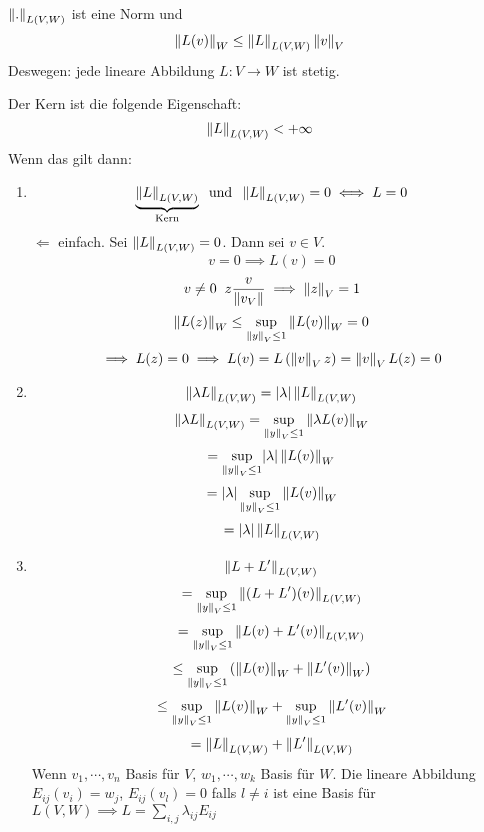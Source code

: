 \begin{Sat}
  $\left\| . \right\|_{L(V,W)}$ ist eine Norm und
  \[\left\| L(v) \right\|_W\leq \left\| L \right\|_{L(V,W)}\left\| v \right\|_V\]
  Deswegen: jede lineare Abbildung $L:V\to W$ ist stetig.
\end{Sat}
\begin{Bew}
  Der Kern ist die folgende Eigenschaft:
  \[\left\| L \right\|_{L(V,W)}<+\infty\]
  Wenn das gilt dann:
  \begin{enumerate}
    \item 
      \[\underbrace{\left\| L \right\|_{L(V,W)}}_\text{Kern}\hspace{2mm}\text{und}\hspace{2mm}\left\| L \right\|_{L(V,W)}=0\iff L=0\]
      $\Leftarrow$ einfach. Sei $\left\| L \right\|_{L(V,W)}=0$. Dann sei $v\in V$.
      \[v=0\implies L(v)=0\]
      \[v\neq 0\hspace{2mm} z\frac{v}{\left\| v_V \right\|}\implies \left\| z \right\|_V=1\]
      \[\left\| L(z) \right\|_W\leq\sup_{\left\| y \right\|_V\leq 1}\left\| L(v) \right\|_W=0\]
      \[\implies L(z)=0\implies L(v)=L\left( \left\| v \right\|_V z \right)=\left\| v \right\|_VL(z)=0\]
    \item
      \[\left\| \lambda L \right\|_{L(V,W)}=\mathopen| \lambda \mathclose|\left\| L \right\|_{L(V,W)}\]
      \[\left\| \lambda L \right\|_{L(V,W)}=\sup_{\left\| y \right\|_V\leq 1}\left\| \lambda L(v) \right\|_W\]
      \[=\sup_{\left\| y \right\|_V\leq 1}\mathopen| \lambda \mathclose|\left\| L(v) \right\|_W\]
      \[=\mathopen| \lambda \mathclose|\sup_{\left\| y \right\|_V\leq 1}\left\| L(v) \right\|_W\]
      \[=\mathopen| \lambda \mathclose|\left\| L \right\|_{L(V,W)}\]
    \item
      \[\left\| L+L' \right\|_{L(V,W)}\]
      \[=\sup_{\left\| y \right\|_V\leq 1}\left\| (L+L')(v) \right\|_{L(V,W)}\]
      \[=\sup_{\left\| y \right\|_V\leq 1}\left\| L(v)+L'(v) \right\|_{L(V,W)}\]
      \[\leq\sup_{\left\| y \right\|_V\leq 1}\left( \left\| L(v) \right\|_W+\left\| L'(v) \right\|_W\right)\]
      \[\leq\sup_{\left\| y \right\|_V\leq 1}\left\| L(v) \right\|_W+\sup_{\left\| y \right\|_V\leq 1}\left\| L'(v) \right\|_W\]
      \[=\left\| L \right\|_{L(V,W)}+\left\| L' \right\|_{L(V,W)}\]
      Wenn $v_1,\cdots,v_n$ Basis für $V$, $w_1,\cdots,w_k$ Basis für $W$. Die lineare Abbildung $E_{ij}(v_i)=w_j$, $E_{ij}(v_l)=0$ falls $l\neq i$ ist eine Basis für $L(V,W)\implies L=\sum_{i,j}\lambda_{ij}E_{ij}$
  \end{enumerate}
\end{Bew}
